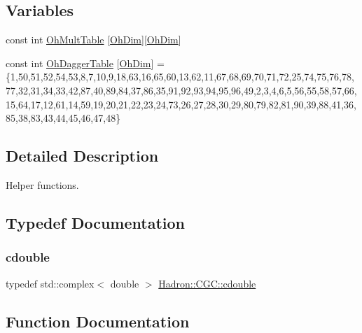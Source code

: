 \subsection*{Variables}
\begin{DoxyCompactItemize}
\item 
const int \mbox{\hyperlink{namespaceHadron_1_1CGC_a1d8567cc768ec6fc24e3b51fbe4b024d}{Oh\+Mult\+Table}} \mbox{[}\mbox{\hyperlink{namespaceHadron_a2bea98b7ecd13619ef78b6d204d59707}{Oh\+Dim}}\mbox{]}\mbox{[}\mbox{\hyperlink{namespaceHadron_a2bea98b7ecd13619ef78b6d204d59707}{Oh\+Dim}}\mbox{]}
\item 
const int \mbox{\hyperlink{namespaceHadron_1_1CGC_a1eb370ef84af334291e2488ffea2c979}{Oh\+Dagger\+Table}} \mbox{[}\mbox{\hyperlink{namespaceHadron_a2bea98b7ecd13619ef78b6d204d59707}{Oh\+Dim}}\mbox{]} = \{1,50,51,52,54,53,8,7,10,9,18,63,16,65,60,13,62,11,67,68,69,70,71,72,25,74,75,76,78,77,32,31,34,33,42,87,40,89,84,37,86,35,91,92,93,94,95,96,49,2,3,4,6,5,56,55,58,57,66,15,64,17,12,61,14,59,19,20,21,22,23,24,73,26,27,28,30,29,80,79,82,81,90,39,88,41,36,85,38,83,43,44,45,46,47,48\}
\end{DoxyCompactItemize}


\subsection{Detailed Description}
Helper functions. 

\subsection{Typedef Documentation}
\mbox{\label{namespaceHadron_1_1CGC_a52d2b70e6792726fb525eab94daae53b}} 
\subsubsection{\texorpdfstring{cdouble}{cdouble}}
{\footnotesize\ttfamily typedef std\+::complex$<$ double $>$ \mbox{\hyperlink{namespaceHadron_1_1CGC_a52d2b70e6792726fb525eab94daae53b}{Hadron\+::\+C\+G\+C\+::cdouble}}}



\subsection{Function Documentation}
\mbox{\label{namespaceHadron_1_1CGC_a3a95d08c25d8f09a43db0baca8c13e6f}} 
